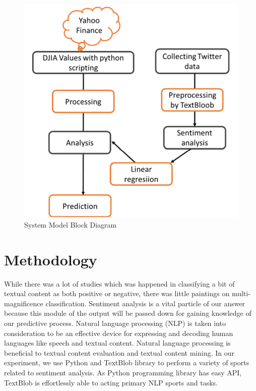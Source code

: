 \begin{figure}[H]
    \centering
    \includegraphics[scale=.7]{img3/diagram.png}
    \caption{System Model Block Diagram}
    \label{fig:Block Diagram}
\end{figure}


\section{Methodology}
While there was a lot of studies which was happened in classifying a bit of textual content as both positive or negative, there was little paintings on multi-magnificence classification. Sentiment analysis is a vital particle of our answer because this module of the output will be passed down for gaining knowledge of our predictive process. Natural language processing (NLP) is taken into consideration to be an effective device for expressing and decoding human languages like speech and textual content. Natural language processing is beneficial to textual content evaluation and textual content mining. In our experiment, we use Python and TextBlob library to perform a variety of sports related to sentiment analysis. As Python programming library has easy API, TextBlob is effortlessly able to acting primary NLP sports and tasks.\\


